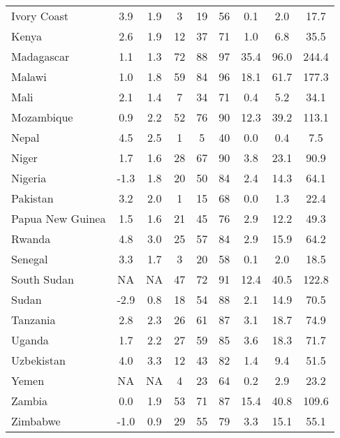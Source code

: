 \begin{table}[b]
{\begin{tabular}[t]{lcccccccc}
Ivory Coast & 3.9 & 1.9 & 3 & 19 & 56 & 0.1 & 2.0 & 17.7\\
Kenya & 2.6 & 1.9 & 12 & 37 & 71 & 1.0 & 6.8 & 35.5\\
Madagascar & 1.1 & 1.3 & 72 & 88 & 97 & 35.4 & 96.0 & 244.4\\
Malawi & 1.0 & 1.8 & 59 & 84 & 96 & 18.1 & 61.7 & 177.3\\
Mali & 2.1 & 1.4 & 7 & 34 & 71 & 0.4 & 5.2 & 34.1\\
Mozambique & 0.9 & 2.2 & 52 & 76 & 90 & 12.3 & 39.2 & 113.1\\
Nepal & 4.5 & 2.5 & 1 & 5 & 40 & 0.0 & 0.4 & 7.5\\
Niger & 1.7 & 1.6 & 28 & 67 & 90 & 3.8 & 23.1 & 90.9\\
Nigeria & -1.3 & 1.8 & 20 & 50 & 84 & 2.4 & 14.3 & 64.1\\
Pakistan & 3.2 & 2.0 & 1 & 15 & 68 & 0.0 & 1.3 & 22.4\\
Papua New Guinea & 1.5 & 1.6 & 21 & 45 & 76 & 2.9 & 12.2 & 49.3\\
Rwanda & 4.8 & 3.0 & 25 & 57 & 84 & 2.9 & 15.9 & 64.2\\
Senegal & 3.3 & 1.7 & 3 & 20 & 58 & 0.1 & 2.0 & 18.5\\
South Sudan & NA & NA & 47 & 72 & 91 & 12.4 & 40.5 & 122.8\\
Sudan & -2.9 & 0.8 & 18 & 54 & 88 & 2.1 & 14.9 & 70.5\\
Tanzania & 2.8 & 2.3 & 26 & 61 & 87 & 3.1 & 18.7 & 74.9\\
Uganda & 1.7 & 2.2 & 27 & 59 & 85 & 3.6 & 18.3 & 71.7\\
Uzbekistan & 4.0 & 3.3 & 12 & 43 & 82 & 1.4 & 9.4 & 51.5\\
Yemen & NA & NA & 4 & 23 & 64 & 0.2 & 2.9 & 23.2\\
Zambia & 0.0 & 1.9 & 53 & 71 & 87 & 15.4 & 40.8 & 109.6\\
Zimbabwe & -1.0 & 0.9 & 29 & 55 & 79 & 3.3 & 15.1 & 55.1\\
\bottomrule
\end{tabular}}
\end{table}